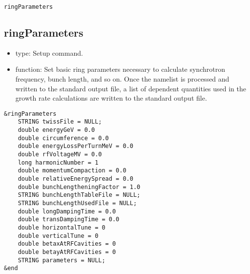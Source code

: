 \documentclass[11pt]{article}
\begin{document}
\newpage 
\begin{center}{\tt ringParameters}\end{center}
\subsection{ringParameters}

\begin{itemize}
\item type: Setup command.
\item function: Set basic ring parameters necessary to calculate
      synchrotron frequency, bunch length, and so on.  Once the
      namelist is processed and written to the standard output file, a
      list of dependent quantities used in the growth rate
      calculations are written to the standard output file.
\end{itemize}
\begin{verbatim}
&ringParameters
    STRING twissFile = NULL;
    double energyGeV = 0.0
    double circumference = 0.0
    double energyLossPerTurnMeV = 0.0
    double rfVoltageMV = 0.0
    long harmonicNumber = 1
    double momentumCompaction = 0.0
    double relativeEnergySpread = 0.0
    double bunchLengtheningFactor = 1.0
    STRING bunchLengthTableFile = NULL;
    STRING bunchLengthUsedFile = NULL;
    double longDampingTime = 0.0
    double transDampingTime = 0.0
    double horizontalTune = 0
    double verticalTune = 0
    double betaxAtRFCavities = 0
    double betayAtRFCavities = 0
    STRING parameters = NULL;
&end
\end{verbatim}
\end{document}
